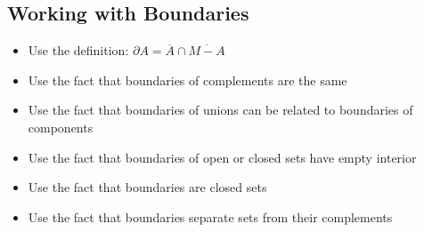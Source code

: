\subsection*{Working with Boundaries}
\begin{itemize}
\item Use the definition: $\partial A = \overline{A} \cap \overline{M - A}$
\item Use the fact that boundaries of complements are the same
\item Use the fact that boundaries of unions can be related to boundaries of components
\item Use the fact that boundaries of open or closed sets have empty interior
\item Use the fact that boundaries are closed sets
\item Use the fact that boundaries separate sets from their complements
\end{itemize}

